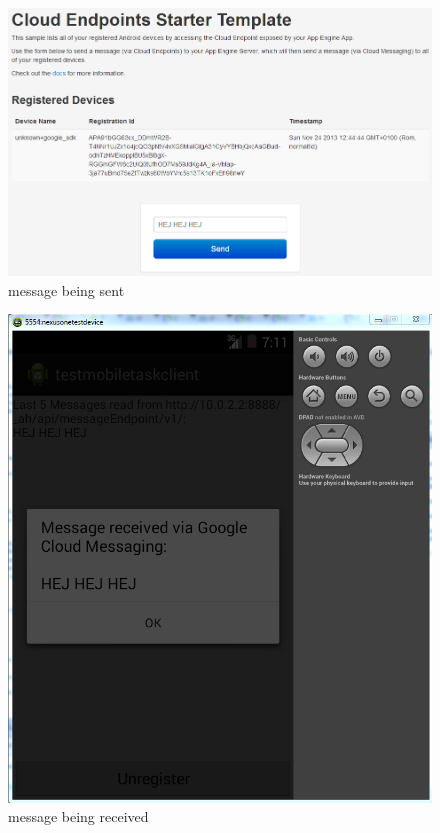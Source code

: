 \begin{figure}[H]
	\centering
	\includegraphics[scale=0.5]{images/googlemessagin_sendmessage.png}
	\caption{message being sent}
	\label{mobile_message_figure}
\end{figure}

\begin{figure}[H]
	\centering
	\includegraphics[scale=0.7]{images/googlecloudmessaging.png}
	\caption{message being received}
	\label{mobile_hej_hej_hej_figure}
\end{figure}


